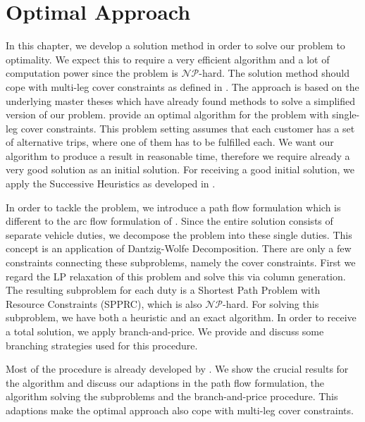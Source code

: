 \chapter{Optimal Approach}
\label{ch:optimal_approach}

In this chapter, we develop a solution method in order to solve our problem to optimality. We expect this to require a very efficient algorithm and a lot of computation power since the problem is $\mathcal{NP}$-hard. The solution method should cope with multi-leg cover constraints as defined in . The approach is based on the underlying master theses which have already found methods to solve a simplified version of our problem. \cite{Kaiser} provide an optimal algorithm for the problem with single-leg cover constraints. This problem setting assumes that each customer has a set of alternative trips, where one of them has to be fulfilled each. We want our algorithm to produce a result in reasonable time, therefore we require already a very good solution as an initial solution. For receiving a good initial solution, we apply the Successive Heuristics as developed in .

In order to tackle the problem, we introduce a path flow formulation which is different to the arc flow formulation of . Since the entire solution consists of separate vehicle duties, we decompose the problem into these single duties. This concept is an application of Dantzig-Wolfe Decomposition. There are only a few constraints connecting these subproblems, namely the cover constraints. First we regard the LP relaxation of this problem and solve this via column generation. The resulting subproblem for each duty is a Shortest Path Problem with Resource Constraints (SPPRC), which is also $\mathcal{NP}$-hard. For solving this subproblem, we have both a heuristic and an exact algorithm. In order to receive a total solution, we apply branch-and-price. We provide and discuss some branching strategies used for this procedure.

Most of the procedure is already developed by \cite{Kaiser}. We show the crucial results for the algorithm and discuss our adaptions in the path flow formulation, the algorithm solving the subproblems and the branch-and-price procedure. This adaptions make the optimal approach also cope with multi-leg cover constraints.


